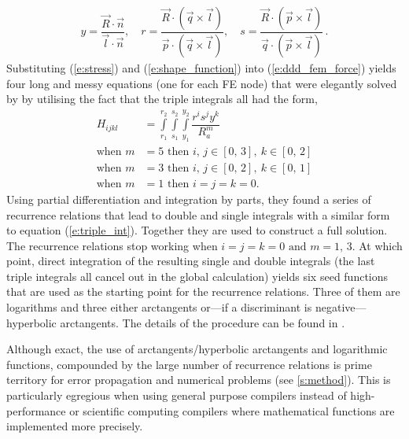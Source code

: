 \documentclass[11pt]{iopart}
\begin{document}
%
\begin{align}
    y = \dfrac{\vec{R}\cdot \vec{n}}{\vec{l}\cdot \vec{n}} \label{se:problem},\quad
    r = \dfrac{\vec{R}\cdot (\vec{q} \times \vec{l})}{\vec{p}\cdot (\vec{q} \times \vec{l})}, \quad
    s = \dfrac{\vec{R}\cdot (\vec{p} \times \vec{l})}{\vec{q}\cdot (\vec{p} \times \vec{l})}\,.
\end{align}
%
Substituting (\ref{e:stress}) and (\ref{e:shape_function}) into (\ref{e:ddd_fem_force}) yields four long and messy equations (one for each FE node) that were elegantly solved by \citet{Queyreau} by utilising the fact that the triple integrals all had the form,
%
\begin{align}
    H_{ijkl}        & = \int\limits_{r_{1}}^{r_{2}}\int\limits_{s_{1}}^{s_{2}}\int\limits_{y_{1}}^{y_{2}} \dfrac{r^i s^j y^k}{R_{a}^{m}}\label{e:triple_int} \\
    \textrm{when }m & = 5 \textrm{ then } i,\, j \in [0,\,3],~k \in [0,\,2]\nonumber                                                                         \\
    \textrm{when }m & = 3 \textrm{ then } i,\, j \in [0,\,2],~k \in [0,\,1]\nonumber                                                                         \\
    \textrm{when }m & = 1 \textrm{ then } i = j = k = 0\nonumber.
\end{align}
%
Using partial differentiation and integration by parts, they found a series of recurrence relations that lead to double and single integrals with a similar form to equation (\ref{e:triple_int}). Together they are used to construct a full solution. The recurrence relations stop working when $i = j = k = 0 \textrm{ and } m = 1,\, 3$. At which point, direct integration of the resulting single and double integrals (the last triple integrals all cancel out in the global calculation) yields six seed functions that are used as the starting point for the recurrence relations. Three of them are logarithms and three either arctangents or---if a discriminant is negative---hyperbolic arctangents. The details of the procedure can be found in \cite{Queyreau}.

Although exact, the use of arctangents/hyperbolic arctangents and logarithmic functions, compounded by the large number of recurrence relations is prime territory for error propagation and numerical problems (see \cref{s:method}). This is particularly egregious when using general purpose compilers instead of high-performance or scientific computing compilers where mathematical functions are implemented more precisely.
\end{document}
